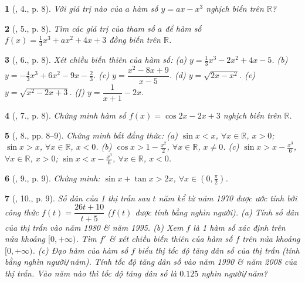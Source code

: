 \documentclass{article}
\newtheorem{baitoan}{}
\begin{document}
\begin{baitoan}[\cite{SGK_Toan_12_giai_tich_nang_cao}, 4., p. 8]
	Với giá trị nào của $a$ hàm số $y = ax - x^3$ nghịch biến trên $\mathbb{R}$?
\end{baitoan}

\begin{baitoan}[\cite{SGK_Toan_12_giai_tich_nang_cao}, 5., p. 8]
	Tìm các giá trị của tham số $a$ để hàm số $f(x) = \frac{1}{3}x^3 + ax^2 + 4x + 3$ đồng biến trên $\mathbb{R}$.
\end{baitoan}

\begin{baitoan}[\cite{SGK_Toan_12_giai_tich_nang_cao}, 6., p. 8]
	Xét chiều biến thiên của hàm số: (a) $y = \frac{1}{3}x^3 - 2x^2 + 4x - 5$. (b) $y = -\frac{4}{3}x^3 + 6x^2 - 9x - \frac{2}{3}$. (c) $y = \dfrac{x^2 - 8x + 9}{x - 5}$. (d) $y = \sqrt{2x - x^2}$. (e) $y = \sqrt{x^2 - 2x + 3}$. (f) $y = \dfrac{1}{x + 1} - 2x$.
\end{baitoan}

\begin{baitoan}[\cite{SGK_Toan_12_giai_tich_nang_cao}, 7., p. 8]
	Chứng minh hàm số $f(x) = \cos2x - 2x + 3$ nghịch biến trên $\mathbb{R}$.
\end{baitoan}

\begin{baitoan}[\cite{SGK_Toan_12_giai_tich_nang_cao}, 8., pp. 8--9]
	Chứng minh bất đẳng thức: (a) $\sin x < x$, $\forall x\in\mathbb{R}$, $x > 0$; $\sin x > x$, $\forall x\in\mathbb{R}$, $x < 0$. (b) $\cos x > 1 - \frac{x^2}{2}$, $\forall x\in\mathbb{R}$, $x\ne0$. (c) $\sin x > x - \frac{x^3}{6}$, $\forall x\in\mathbb{R}$, $x > 0$; $\sin x < x - \frac{x^3}{6}$, $\forall x\in\mathbb{R}$, $x < 0$.
\end{baitoan}

\begin{baitoan}[\cite{SGK_Toan_12_giai_tich_nang_cao}, 9., p. 9]
	Chứng minh: $\sin x + \tan x > 2x$, $\forall x\in\left(0,\frac{\pi}{2}\right)$.
\end{baitoan}

\begin{baitoan}[\cite{SGK_Toan_12_giai_tich_nang_cao}, 10., p. 9]
	Số dân của 1 thị trấn sau $t$ năm kể từ năm 1970 được ước tính bởi công thức $f(t) = \dfrac{26t + 10}{t + 5}$ ($f(t)$ được tính bằng nghìn người). (a) Tính số dân của thị trấn vào năm 1980 \& năm 1995. (b) Xem $f$ là 1 hàm số xác định trên nửa khoảng $[0,+\infty)$. Tìm $f'$ \& xét chiều biến thiên của hàm số $f$ trên nửa khoảng $[0,+\infty)$. (c) Đạo hàm của hàm số $f$ biểu thị tốc độ tăng dân số của thị trấn (tính bằng nghìn người{\tt/}năm). Tính tốc độ tăng dân số vào năm 1990 \& năm 2008 của thị trấn. Vào năm nào thì tốc độ tăng dân số là $0.125$ nghìn người{\tt/}năm?
\end{baitoan}
\end{document}
